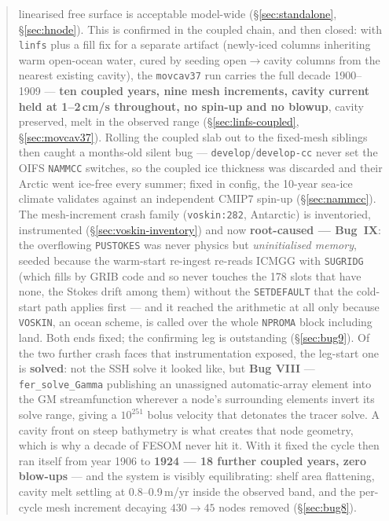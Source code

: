 \documentclass[11pt,a4paper]{article}
\newcommand{\code}[1]{\texttt{\small #1}}
\begin{document}
\begin{abstract}
linearised free surface is acceptable model-wide (\S\ref{sec:standalone}, \S\ref{sec:hnode}).
This is confirmed in the coupled chain, and then closed: with \code{linfs} plus a fill fix for a
separate artifact (newly-iced columns inheriting warm open-ocean water, cured by seeding
open$\to$cavity columns from the nearest existing cavity), the \code{movcav37} run carries the full
decade 1900--1909 --- \textbf{ten coupled years, nine mesh increments, cavity current held at
1--2\,cm/s throughout, no spin-up and no blowup}, cavity preserved, melt in the observed range
(\S\ref{sec:linfs-coupled}, \S\ref{sec:movcav37}). Rolling the coupled slab out to the fixed-mesh
siblings then caught a months-old silent bug --- \code{develop}/\code{develop-cc} never set the OIFS
\code{NAMMCC} switches, so the coupled ice thickness was discarded and their Arctic went ice-free
every summer; fixed in config, the 10-year sea-ice climate validates against an independent CMIP7
spin-up (\S\ref{sec:nammcc}). The mesh-increment crash family (\code{voskin:282}, Antarctic) is
inventoried, instrumented (\S\ref{sec:voskin-inventory}) and now \textbf{root-caused --- Bug~IX}: the
overflowing \code{PUSTOKES} was never physics but \emph{uninitialised memory}, seeded because the
warm-start re-ingest re-reads ICMGG with \code{SUGRIDG} (which fills by GRIB code and so never touches
the 178 slots that have none, the Stokes drift among them) without the \code{SETDEFAULT} that the
cold-start path applies first --- and it reached the arithmetic at all only because \code{VOSKIN}, an
ocean scheme, is called over the whole \code{NPROMA} block including land. Both ends fixed; the
confirming leg is outstanding (\S\ref{sec:bug9}). Of the two further
crash faces that instrumentation exposed, the leg-start one is \textbf{solved}: not the SSH solve it
looked like, but \textbf{Bug VIII} --- \code{fer\_solve\_Gamma} publishing an unassigned automatic-array
element into the GM streamfunction wherever a node's surrounding elements invert its solve range, giving
a $10^{251}$ bolus velocity that detonates the tracer solve. A cavity front on steep bathymetry is what
creates that node geometry, which is why a decade of FESOM never hit it. With it fixed the cycle then
ran itself from year 1906 to \textbf{1924 --- 18 further coupled years, zero blow-ups} --- and the
system is visibly equilibrating: shelf area flattening, cavity melt settling at 0.8--0.9\,m/yr inside
the observed band, and the per-cycle mesh increment decaying $430\to45$ nodes removed
(\S\ref{sec:bug8}).
\end{abstract}
\end{document}
